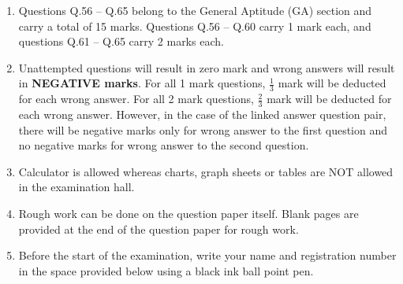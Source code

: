 \documentclass[12pt]{article}
\begin{document}
\begin{enumerate}[leftmargin=2em,itemsep=0.5em]
    \item Questions Q.56 – Q.65 belong to the General Aptitude (GA) section and carry a total of 15 marks. Questions Q.56 – Q.60 carry 1 mark each, and questions Q.61 – Q.65 carry 2 marks each.
    \item Unattempted questions will result in zero mark and wrong answers will result in \textbf{NEGATIVE marks}. For all 1 mark questions, $\tfrac{1}{3}$ mark will be deducted for each wrong answer. For all 2 mark questions, $\tfrac{2}{3}$ mark will be deducted for each wrong answer. However, in the case of the linked answer question pair, there will be negative marks only for wrong answer to the first question and no negative marks for wrong answer to the second question.
    \item Calculator is allowed whereas charts, graph sheets or tables are NOT allowed in the examination hall.
    \item Rough work can be done on the question paper itself. Blank pages are provided at the end of the question paper for rough work.
    \item Before the start of the examination, write your name and registration number in the space provided below using a black ink ball point pen.
\end{enumerate}

\newpage
\end{document}

